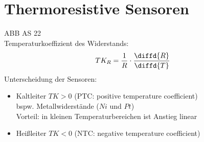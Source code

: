 \section{Thermoresistive Sensoren}
ABB AS 22\\
Temperaturkoeffizient des Widerstands:
$$TK_R=\frac{1}{R}\cdot \frac{\diffd{R}}{\diffd{T}}$$
Unterscheidung der Sensoren:
\begin{itemize}
\item Kaltleiter $TK>0$ (PTC: positive temperature coefficient)\\
bspw. Metallwiderstände ($Ni$ und $Pt$)\\
Vorteil: in kleinen Temperaturbereichen ist Anstieg linear
\item Heißleiter $TK<0$ (NTC: negative temperature coefficient)
\end{itemize}

